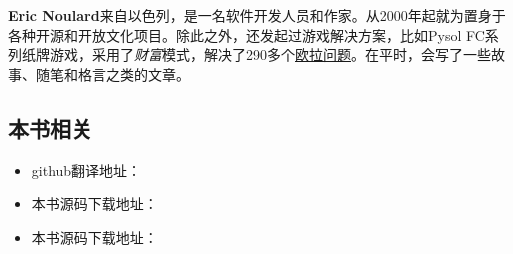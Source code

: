 \textbf{Eric Noulard}来自以色列，是一名软件开发人员和作家。从2000年起就为置身于各种开源和开放文化项目。除此之外，还发起过游戏解决方案，比如Pysol FC系列纸牌游戏，采用了\emph{财富}模式，解决了290多个\href{https://projecteuler.net/index.php?section=view}{欧拉问题}。在平时，会写了一些故事、随笔和格言之类的文章。

\subsection{本书相关}

\begin{itemize}
\item github翻译地址：

\item 本书源码下载地址：

\item 本书源码下载地址：

\end{itemize}


